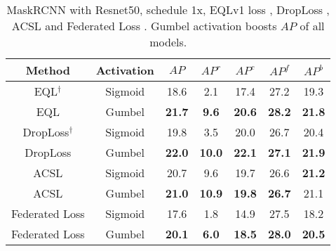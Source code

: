 \documentclass[runningheads]{llncs}
\begin{document}
\begin{table}
    \centering
    \caption{MaskRCNN with Resnet50, schedule 1x, EQLv1 loss \cite{tan2020equalization}, DropLoss \cite{hsieh2021droploss}, ACSL \cite{wang2021adaptive} and Federated Loss \cite{zhou2021probablistic}. Gumbel activation boosts $AP$ of all models.}
    \begin{tabular}{c|c|c|c|c|c|c}
         Method&Activation&$AP$&$AP^r$&$AP^c$&$AP^f$&$AP^b$  \\
         \hline
         EQL$^\dagger$\cite{tan2021equalization}&Sigmoid& 18.6&2.1&17.4&27.2&19.3 \\
          EQL&Gumbel&\textbf{21.7}&\textbf{9.6}&\textbf{20.6}&\textbf{28.2}&\textbf{21.8}\\
         \hline
         DropLoss$^\dagger$\cite{hsieh2021droploss}&Sigmoid& 19.8&3.5&20.0&26.7&20.4 \\
         DropLoss&Gumbel&\textbf{22.0}&\textbf{10.0}&\textbf{22.1}&\textbf{27.1}&\textbf{21.9} \\
         \hline
         ACSL \cite{wang2021adaptive} &Sigmoid  &20.7  &9.6  &19.7 &26.6&\textbf{21.2}\\
         ACSL &Gumbel &\textbf{21.0} &\textbf{10.9}&\textbf{19.8}&\textbf{26.7}&21.1\\
         \hline
         Federated Loss \cite{zhou2021probablistic} &Sigmoid &17.6  &1.8 &14.9&27.5&18.2\\
         Federated Loss &Gumbel &\textbf{20.1}&\textbf{6.0}&\textbf{18.5}&\textbf{28.0}&\textbf{20.5}\\
    \end{tabular}
    \label{tab:detailed_gumbel_sota}
\end{table}
\end{document}
